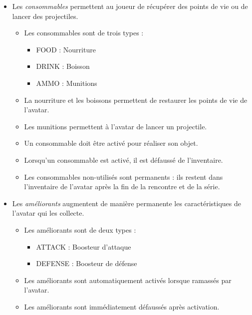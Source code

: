 \begin{itemize}
        \item Les \textit{consommables} permettent au joueur de récupérer des points de vie ou de lancer des projectiles.
        \begin{itemize}
            \item Les consommables sont de trois types :
                \begin{itemize}
                    \item FOOD : Nourriture
                    \item DRINK : Boisson
                    \item AMMO : Munitions
                \end{itemize}
            \item La nourriture et les boissons permettent de restaurer les points de vie de l'avatar.
            \item Les munitions permettent à l'avatar de lancer un projectile.
            \item Un consommable doit être activé pour réaliser son objet.
            \item Lorsqu'un consommable est activé, il est défaussé de l'inventaire.
            \item Les consommables non-utilisés sont permanents : ils restent dans l'inventaire de l'avatar après la fin de la rencontre et de la série.
        \end{itemize}

        \item Les \textit{améliorants} augmentent de manière permanente les caractéristiques de l'avatar qui les collecte.
            \begin{itemize}
                \item Les améliorants sont de deux types :
                    \begin{itemize}
                        \item ATTACK :  Boosteur d'attaque
                        \item DEFENSE : Boosteur de défense
                    \end{itemize}
                \item Les améliorants sont automatiquement activés lorsque ramassés par l'avatar.
                \item Les améliorants sont immédiatement défaussés après activation.
            \end{itemize}
            

\end{itemize}

